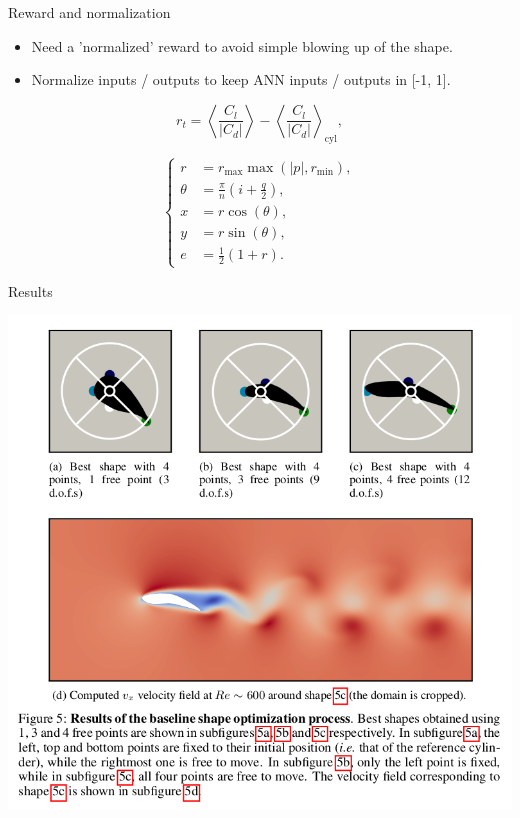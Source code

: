 \documentclass{beamer}
\begin{document}
\begin{frame}{Reward and normalization}
    \begin{itemize}
        \item Need a 'normalized' reward to avoid simple blowing up of the shape.
        \item Normalize inputs / outputs to keep ANN inputs / outputs in [-1, 1].
    \end{itemize}


\begin{equation}
\label{eq:reward_wing}
	r_t = \left< \frac{C_l}{\left| C_d \right|} \right> - \left< \frac{C_l}{\left| C_d \right|} \right>_{\text{cyl}},
\end{equation} 

\begin{equation}
	\left\{
	\begin{aligned}
		r &= r_{\text{max}} \max \left( \left| p \right|, r_{\text{min}} \right),\\
		\theta &= \frac{\pi}{n} \left( i + \frac{q}{2} \right),\\
		x &= r \cos \left( \theta \right),\\
		y &= r \sin \left( \theta \right),\\
		e &= \frac{1}{2} \left(1 + r \right).
	\end{aligned}
	\right.
\end{equation}

\end{frame}

\begin{frame}{Results}
    \begin{center}
      \includegraphics[width=.65\textwidth]{Figures/results_shape_opt}
    \end{center}
\end{frame}
\end{document}
